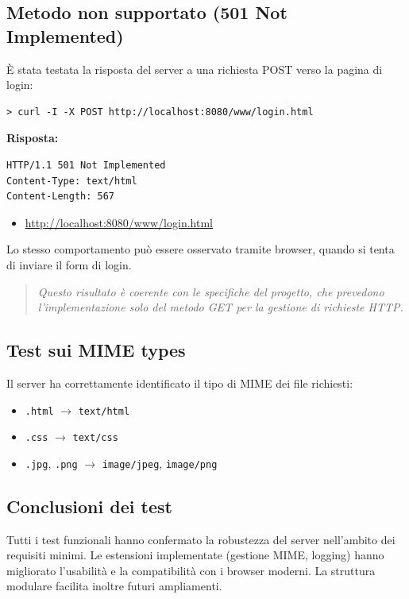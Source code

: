 \documentclass[a4paper,12pt]{report}
\begin{document}
\subsection{Metodo non supportato (501 Not Implemented)}
È stata testata la risposta del server a una richiesta POST verso la pagina di login:
\begin{verbatim}
> curl -I -X POST http://localhost:8080/www/login.html
\end{verbatim}

\textbf{Risposta:}
\begin{verbatim}
HTTP/1.1 501 Not Implemented
Content-Type: text/html
Content-Length: 567
\end{verbatim}

\begin{itemize}
    \item \url{http://localhost:8080/www/login.html}
\end{itemize}
Lo stesso comportamento può essere osservato tramite browser, quando si tenta di inviare il form di login.

\vspace{0.5cm}

\begin{quote}
    \textit{Questo risultato è coerente con le specifiche del progetto, che prevedono l'implementazione solo del metodo GET per
        la gestione di richieste HTTP.}
\end{quote}

\subsection{Test sui MIME types}
Il server ha correttamente identificato il tipo di MIME dei file richiesti:
\begin{itemize}
    \item \texttt{.html} $\rightarrow$ \texttt{text/html}
    \item \texttt{.css} $\rightarrow$ \texttt{text/css}
    \item \texttt{.jpg}, \texttt{.png} $\rightarrow$ \texttt{image/jpeg}, \texttt{image/png}
\end{itemize}

\subsection{Conclusioni dei test}
Tutti i test funzionali hanno confermato la robustezza del server nell'ambito dei requisiti minimi. Le estensioni implementate (gestione MIME, logging)
hanno migliorato l'usabilità e la compatibilità con i browser moderni. La struttura modulare facilita inoltre futuri ampliamenti.
\end{document}
